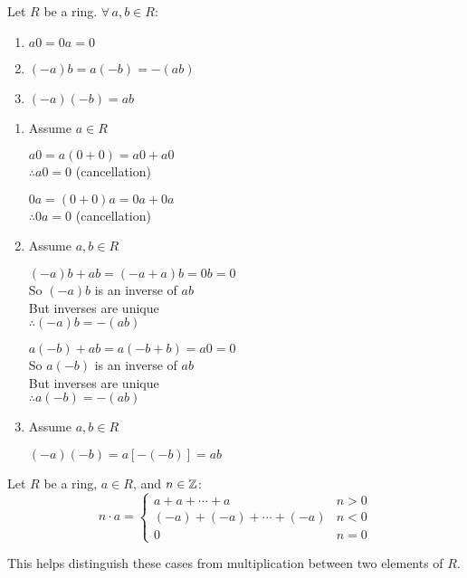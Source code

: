 \documentclass[letterpaper,12pt,fleqn]{article}
\begin{document}
\begin{theorem}
  Let $R$ be a ring. $\forall\,a,b\in R$:
  \begin{enumerate}
  \item $a0=0a=0$
  \item $(-a)b=a(-b)=-(ab)$
  \item $(-a)(-b)=ab$
  \end{enumerate}
\end{theorem}
\newpage
\begin{theproof}
  \listbreak
  \begin{enumerate}
  \item Assume $a\in R$

    $a0=a(0+0)=a0+a0$ \\
    $\therefore a0=0$ (cancellation)

    $0a=(0+0)a=0a+0a$ \\
    $\therefore 0a=0$ (cancellation)

  \item Assume $a,b\in R$

    $(-a)b+ab=(-a+a)b=0b=0$ \\
    So $(-a)b$ is an inverse of $ab$ \\
    But inverses are unique \\
    $\therefore (-a)b=-(ab)$

    $a(-b)+ab=a(-b+b)=a0=0$ \\
    So $a(-b)$ is an inverse of $ab$ \\
    But inverses are unique \\
    $\therefore a(-b)=-(ab)$

  \item Assume $a,b\in R$

    $(-a)(-b)=a[-(-b)]=ab$
  \end{enumerate}
\end{theproof}

\begin{notation}
  Let $R$ be a ring, $a\in R$, and $n\in\mathbb{Z}$:
  \[n\cdot a=\begin{cases}
  a+a+\cdots+a & n>0 \\
  (-a)+(-a)+\cdots+(-a) & n<0 \\
  0 & n=0
  \end{cases}\]

  This helps distinguish these cases from multiplication between two elements of $R$.
\end{notation}
\end{document}

